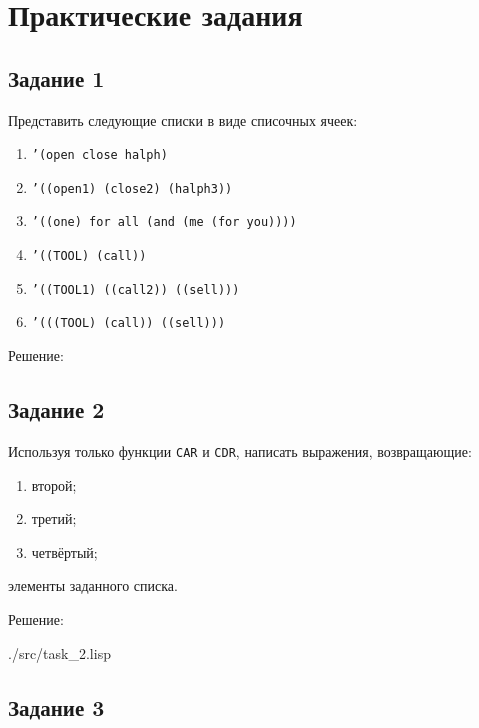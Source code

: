 \chapter{Практические задания}

\section*{Задание 1}
Представить следующие списки в виде списочных ячеек:
\begin{enumerate}[label=\arabic*)]
	\item \texttt{'(open close halph)}
	\item \texttt{'((open1) (close2) (halph3))}
	\item \texttt{'((one) for all (and (me (for you))))}
	\item \texttt{'((TOOL) (call))}
	\item \texttt{'((TOOL1) ((call2)) ((sell)))}
	\item \texttt{'(((TOOL) (call)) ((sell)))}
\end{enumerate}

Решение:
\clearpage
{}


\section*{Задание 2}
Используя только функции \texttt{CAR} и \texttt{CDR},  написать выражения, возвращающие:
\begin{enumerate}[label=\arabic*)]
	\item второй;
	\item третий;
	\item четвёртый;
\end{enumerate}
элементы заданного списка.

Решение: 

\begin{lstinputlisting}[
	caption={Задание 2},
	label={lst:t2},
	style={lsp},
	]{./src/task_2.lisp}
\end{lstinputlisting}


\section*{Задание 3}

